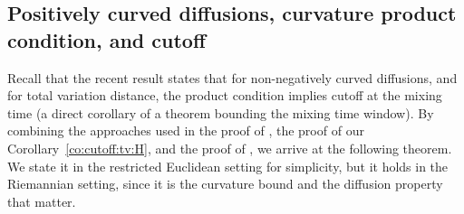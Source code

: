 \documentclass[10pt,reqno]{amsart}
\numberwithin{equation}{section}
\begin{document}
\subsection{Positively curved diffusions, curvature product condition, and cutoff}

Recall that the recent result \cite[Cor.~1]{salez-2025} states that for
non-negatively curved diffusions, and for total variation distance, the
product condition implies cutoff at the mixing time (a direct corollary of a
theorem bounding the mixing time window). By combining the approaches used in
the proof of \cite[Cor.~1]{salez-2025}, the proof of our
Corollary~\ref{co:cutoff:tv:H}, and the proof of \cite[Th.~3.3]{MR2375599}, we
arrive at the following theorem. We state it in the restricted Euclidean
setting for simplicity, but it holds in the Riemannian setting, since it is
the curvature bound and the diffusion property that matter.
\end{document}
